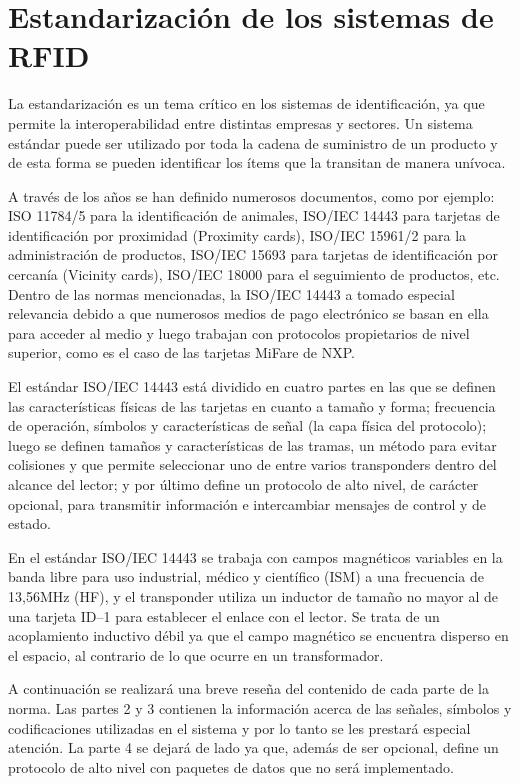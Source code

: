 \section{Estandarización de los sistemas de RFID}

La estandarización es un tema crítico en los sistemas de identificación, ya 
que permite la interoperabilidad entre distintas empresas y sectores. Un 
sistema estándar puede ser utilizado por toda la cadena de suministro de un 
producto y de esta forma se pueden identificar los ítems que la transitan de 
manera unívoca.

A través de los años se han definido numerosos documentos, como por ejemplo: 
ISO 11784/5 para la identificación de animales, ISO/IEC 14443 para tarjetas 
de identificación por proximidad (Proximity cards), ISO/IEC 15961/2 para la 
administración de productos, ISO/IEC 15693 para tarjetas de identificación 
por cercanía (Vicinity cards), ISO/IEC 18000 para el seguimiento de 
productos, etc. Dentro de las normas mencionadas, la ISO/IEC 14443 a tomado 
especial relevancia debido a que numerosos medios de pago electrónico se 
basan en ella para acceder al medio y luego trabajan con protocolos 
propietarios de nivel superior, como es el caso de las tarjetas MiFare de 
NXP. 

El estándar ISO/IEC 14443 está dividido en cuatro partes en las que se 
definen las características físicas de las tarjetas en cuanto a tamaño y 
forma; frecuencia de operación, símbolos y características de señal (la capa 
física del protocolo); luego se definen tamaños y características de las 
tramas, un método para evitar colisiones y que permite seleccionar uno de 
entre varios transponders dentro del alcance del lector; y por último define 
un protocolo de alto nivel, de carácter opcional, para transmitir 
información e intercambiar mensajes de control y de estado.

En el estándar ISO/IEC 14443 se trabaja con campos magnéticos variables en 
la banda libre para uso industrial, médico y científico (ISM) a una 
frecuencia de 13,56MHz (HF), y el transponder utiliza un inductor de tamaño 
no mayor al de una tarjeta ID--1 \cite{ISO7810} 
para establecer el enlace con el lector. Se 
trata de un acoplamiento inductivo débil ya que el campo magnético se 
encuentra disperso en el espacio, al contrario de lo que ocurre en un 
transformador.

A continuación se realizará una breve reseña del contenido de cada parte de 
la norma. Las partes 2 y 3 contienen la información acerca de las señales, 
símbolos y codificaciones utilizadas en el sistema y por lo tanto se les 
prestará especial atención. La parte 4 se dejará de lado ya que, además de 
ser opcional, define un protocolo de alto nivel con paquetes de datos que no 
será implementado.

